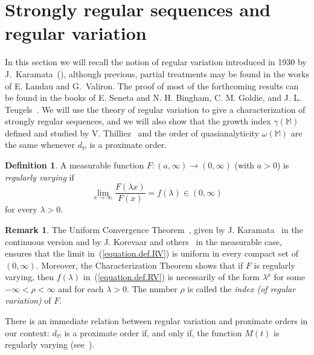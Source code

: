 \documentclass[11pt,a4paper]{article}
\theoremstyle{definition}
\newcounter{Polya}
\newtheorem{defi}[theo]{Definition}
\newtheorem{rema}[theo]{Remark}
\newenvironment{den}{\smallskip\begin{defi}}{\end{defi}\smallskip}
\def\oo{\infty}
\def\ri{\rightarrow}
\def\o{\omega}
\def\ro{\rho}
\def\M{\mathbb{M}}
\begin{document}
\section{Strongly regular sequences and regular variation}



In this section we will recall the notion of regular variation introduced in 1930 by J.~Karamata~(\cite{karamata1,karamata2}), although previous, partial treatments
may be found in the works of E. Landau\cite{landau} and G.~Valiron\cite{valiron13}.
The proof of most of the forthcoming results can be found in the books of
E. Seneta\cite{seneta}  and N. H. Bingham, C. M. Goldie, and J. L. Teugels~\cite{bingGoldTeug}. We will use the theory of regular variation to give a characterization of strongly regular sequences, and we will also show that the growth index $\gamma(\M)$ defined and studied by V. Thilliez~\cite{thilliez}
and the order of quasianalyticity  $\o(\M)$ %
are the same whenever $d_{\M}$ is a proximate order.


\begin{den}
 A measurable function $F:(a,\oo)\ri(0,\oo)$ (with $a>0$) is \textit{regularly varying} if
 \begin{equation}\label{equation.def.RV}
 \lim_{x\ri\oo} \frac{F(\lambda x)}{F(x)} = f(\lambda)\in(0,\oo)
 \end{equation}
for every $\lambda>0$.
\end{den}

\begin{rema} The Uniform Convergence Theorem~\cite[Chap.\ 1.2]{bingGoldTeug}, given by J. Karamata~\cite{karamata1} in the continuous version
and by J. Korevaar and others~\cite{korevaar} in the measurable case,
ensures that the limit in~(\ref{equation.def.RV}) is uniform in every compact set of $(0,\oo)$.
Moreover, the Characterization Theorem \cite[Chap.\ 1.4]{bingGoldTeug} shows that if $F$ is regularly varying, then $f(\lambda)$
in~(\ref{equation.def.RV}) is necessarily of the form $\lambda^\ro$ for some $-\oo<\ro<\oo$ and for each $\lambda>0$.
The number $\ro$ is called the \textit{ index (of regular variation)} of $F$.
\end{rema}

There is an immediate relation between regular variation and proximate orders in our context: $d_{\M}$ is a proximate order if, and only if, the function $M(t)$ is regularly varying (see~\cite[Subsection\ 7.4.1]{bingGoldTeug}).
\end{document}
